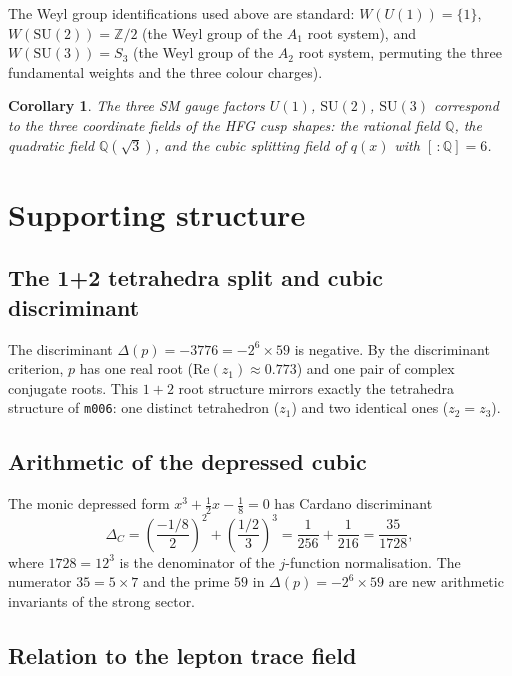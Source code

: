 \documentclass[11pt,a4paper]{article}
\newtheorem{corollary}{Corollary}
\theoremstyle{definition}
\theoremstyle{remark}
\newcommand{\mfld}[1]{\texttt{#1}}
\begin{document}
The Weyl group identifications used above are standard:
$W(U(1))=\{1\}$, $W(\mathrm{SU}(2))=\mathbb{Z}/2$ (the Weyl group of
the $A_1$ root system), and $W(\mathrm{SU}(3))=S_3$ (the Weyl group of
the $A_2$ root system, permuting the three fundamental weights and the
three colour charges).

\begin{corollary}
The three SM gauge factors $U(1)$, $\mathrm{SU}(2)$, $\mathrm{SU}(3)$
correspond to the three coordinate fields of the HFG cusp shapes:
the rational field $\mathbb{Q}$, the quadratic field $\mathbb{Q}(\sqrt{3})$,
and the cubic splitting field of $q(x)$ with $[\,:\mathbb{Q}]=6$.
\end{corollary}

\section{Supporting structure}
\label{sec:support}

\subsection{The 1+2 tetrahedra split and cubic discriminant}

The discriminant $\Delta(p)=-3776=-2^6\times59$ is negative.
By the discriminant criterion, $p$ has one real root
($\mathrm{Re}(z_1)\approx0.773$) and one pair of complex conjugate roots.
This $1+2$ root structure mirrors exactly the tetrahedra structure of
\mfld{m006}: one distinct tetrahedron ($z_1$) and two identical ones
($z_2=z_3$).

\subsection{Arithmetic of the depressed cubic}

The monic depressed form $x^3+\tfrac12 x-\tfrac18=0$ has
Cardano discriminant
\begin{equation}
\Delta_C = \left(\frac{-1/8}{2}\right)^2+\left(\frac{1/2}{3}\right)^3
= \frac{1}{256}+\frac{1}{216}
= \frac{35}{1728},
\end{equation}
where $1728=12^3$ is the denominator of the $j$-function normalisation.
The numerator $35=5\times7$ and the prime $59$ in $\Delta(p)=-2^6\times59$
are new arithmetic invariants of the strong sector.

\subsection{Relation to the lepton trace field}
\end{document}
